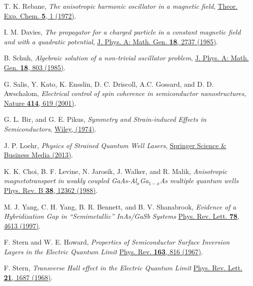 \documentclass[aps,floatfix,twocolumn,showpacs,10pt,nofootinbib]{revtex4-1}
\begin{document}
\begin{thebibliography}{99}
T. K. Rebane, \textit{The anisotropic harmonic oscillator in a magnetic field},
\href{http://dx.doi.org/10.1007/BF00525487}{Theor. Exp. Chem. {\bf 5}, 1 (1972)}.

I. M. Davies, \textit{The propagator for a charged particle in a constant magnetic field and with a quadratic potential},
\href{http://dx.doi.org/10.1088/0305-4470/18/14/024}{J. Phys. A: Math. Gen. {\bf 18}, 2737 (1985)}.

B. Schuh, \textit{Algebraic solution of a non-trivial oscillator problem},
\href{http://dx.doi.org/10.1088/0305-4470/18/5/013}{J. Phys. A: Math. Gen. {\bf 18}, 803 (1985)}.

G. Salis, Y. Kato, K. Ensslin, D. C. Driscoll, A.C. Gossard, and D. D. Awschalom, \textit{Electrical control of spin coherence in semiconductor nanostructures},
\href{https://doi.org/10.1038/414619a}{Nature {\bf 414}, 619 (2001)}.

G. L. Bir, and G. E. Pikus, \textit{Symmetry and Strain-induced Effects in Semiconductors},
\href{https://books.google.co.jp/books?id=38m2QgAACAAJ}{Wiley, (1974)}.

J. P. Loehr, \textit{Physics of Strained Quantum Well Lasers},
\href{https://www.amazon.com/Physics-Strained-Quantum-Well-Lasers/dp/0792380983}{Springer Science \& Business Media (2013)}.


K. K. Choi, B. F. Levine, N. Jarosik, J. Walker, and R. Malik,
\textit{Anisotropic magnetotransport in weakly coupled GaAs-Al$_x$Ga$_{1-x}$As multiple quantum wells}
\href{https://doi.org/10.1103/PhysRevB.38.12362}{Phys. Rev. B \textbf{38}, 12362 (1988)}.

M. J. Yang, C. H. Yang, B. R. Bennett, and B. V. Shanabrook,
\textit{Evidence of a Hybridization Gap in ``Semimetallic'' InAs/GaSb Systems}
\href{https://doi.org/10.1103/PhysRevLett.78.4613}{Phys. Rev. Lett. \textbf{78}, 4613 (1997)}.

F. Stern and W. E. Howard,
\textit{Properties of Semiconductor Surface Inversion Layers in the Electric Quantum Limit}
\href{https://doi.org/10.1103/PhysRev.163.816}{Phys. Rev. \textbf{163}, 816 (1967)}.

F. Stern,
\textit{Transverse Hall effect in the Electric Quantum Limit}
\href{https://doi.org/10.1103/PhysRevLett.21.1687}{Phys. Rev. Lett. \textbf{21}, 1687 (1968)}.


\end{thebibliography}
\end{document}
